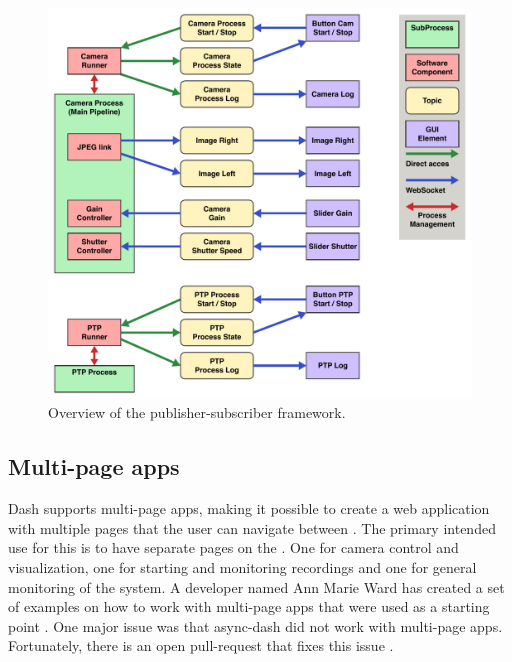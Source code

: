 \begin{figure}[H]
    \centering
    \includegraphics[width=\textwidth]{figures/gui/pubsub_graph.pdf}
    \caption{Overview of the publisher-subscriber framework.}
    \label{fig:pub_sub_graph}
\end{figure}

\subsection{Multi-page apps}
Dash supports multi-page apps, making it possible to create a web application with multiple pages that the user can navigate between \cite{plotlyMultiPageAppsURL}.
The primary intended use for this is to have separate pages on the \srgui.
One for camera control and visualization, one for starting and monitoring recordings and one for general monitoring of the system.
A developer named Ann Marie Ward has created a set of examples on how to work with multi-page apps that were used as a starting point \cite{wardExamplesMultipageApps03Jul22}.
One major issue was that \gls{async-dash} did not work with multi-page apps.
Fortunately, there is an open pull-request that fixes this issue \cite{lekAddFlaskRequest2022}.